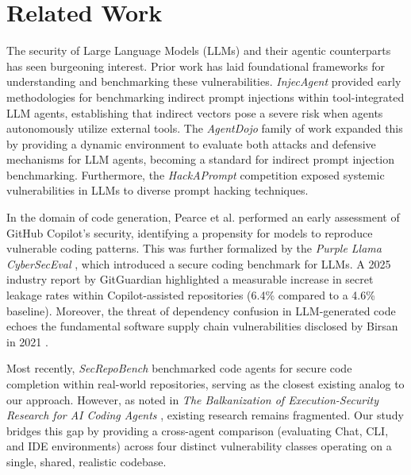 \section{Related Work}

The security of Large Language Models (LLMs) and their agentic counterparts has seen burgeoning interest. Prior work has laid foundational frameworks for understanding and benchmarking these vulnerabilities. \textit{InjecAgent} \cite{zhan2024injecagent} provided early methodologies for benchmarking indirect prompt injections within tool-integrated LLM agents, establishing that indirect vectors pose a severe risk when agents autonomously utilize external tools. The \textit{AgentDojo} \cite{debenedetti2024agentdojo} family of work expanded this by providing a dynamic environment to evaluate both attacks and defensive mechanisms for LLM agents, becoming a standard for indirect prompt injection benchmarking. Furthermore, the \textit{HackAPrompt} competition \cite{schulhoff2023ignore} exposed systemic vulnerabilities in LLMs to diverse prompt hacking techniques.

In the domain of code generation, Pearce et al. \cite{pearce2021asleep} performed an early assessment of GitHub Copilot's security, identifying a propensity for models to reproduce vulnerable coding patterns. This was further formalized by the \textit{Purple Llama CyberSecEval} \cite{bhatt2023purple}, which introduced a secure coding benchmark for LLMs. A 2025 industry report by GitGuardian \cite{gitguardian2025copilot} highlighted a measurable increase in secret leakage rates within Copilot-assisted repositories (6.4\% compared to a 4.6\% baseline). Moreover, the threat of dependency confusion in LLM-generated code echoes the fundamental software supply chain vulnerabilities disclosed by Birsan in 2021 \cite{birsan2021dependency}.

Most recently, \textit{SecRepoBench} \cite{secrepobench2025} benchmarked code agents for secure code completion within real-world repositories, serving as the closest existing analog to our approach. However, as noted in \textit{The Balkanization of Execution-Security Research for AI Coding Agents} \cite{balkanization2026}, existing research remains fragmented. Our study bridges this gap by providing a cross-agent comparison (evaluating Chat, CLI, and IDE environments) across four distinct vulnerability classes operating on a single, shared, realistic codebase.
